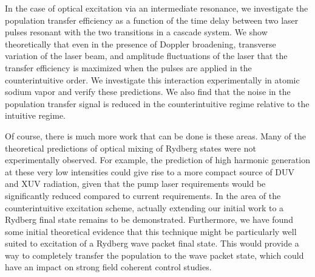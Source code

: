 In the case of optical excitation via an intermediate resonance, we investigate
the population transfer efficiency as a function of the time delay between two
laser pulses resonant with the two transitions in a cascade system.  We show
theoretically that even in the presence of Doppler broadening, transverse
variation of the laser beam, and amplitude fluctuations of the laser that the
transfer efficiency is maximized when the pulses are applied in the
counterintuitive order.  We investigate this interaction experimentally in
atomic sodium vapor and verify these predictions.  We also find that the noise
in the population transfer signal is reduced in the counterintuitive regime
relative to the intuitive regime.

Of course, there is much more work that can be done is these areas.  Many of
the theoretical predictions of optical mixing of Rydberg states were not
experimentally observed.  For example, the prediction of high harmonic
generation at these very low intensities could give rise to a more compact
source of DUV and XUV radiation, given that the pump laser requirements would
be significantly reduced compared to current requirements.  In the area of the
counterintuitive excitation scheme, actually extending our initial work to a
Rydberg final state remains to be demonstrated.  Furthermore, we have found
some initial theoretical evidence  that this technique might be particularly
well suited to excitation of a Rydberg wave packet final state.  This would
provide a way to completely transfer the population to the wave packet state,
which could have an impact on strong field coherent control studies.
